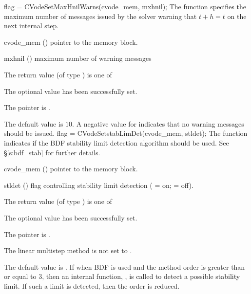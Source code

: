 {
flag = CVodeSetMaxHnilWarns(cvode\_mem, mxhnil);
}
{
  The function  specifies the maximum number of
  messages issued by the solver warning that $t+h=t$ on the next internal step.
}
{
  \begin{args}
  \item[cvode\_mem] ()
    pointer to the {\cvodes} memory block.
  \item[mxhnil] ()
    maximum number of warning messages
  \end{args}
}
{
  The return value  (of type ) is one of
  \begin{args}
  \item[\Id{CV\_SUCCESS}] 
    The optional value has been successfully set.
  \item[\Id{CV\_MEM\_NULL}]
    The  pointer is .
  \end{args}
}
{
  The default value is $10$.
  A negative value for  indicates that no warning messages should
  be issued.
}
{
flag = CVodeSetstabLimDet(cvode\_mem, stldet);
}
{
  The function  indicates if
  the BDF stability limit detection algorithm should be used. See \S\ref{s:bdf_stab}
  for further details.
}
{
  \begin{args}
  \item[cvode\_mem] ()
    pointer to the {\cvodes} memory block.
  \item[stldet] ()
    flag controlling stability limit detection ( = on;  = off).
  \end{args}
}
{
  The return value  (of type ) is one of
  \begin{args}
  \item[\Id{CV\_SUCCESS}] 
    The optional value has been successfully set.
  \item[\Id{CV\_MEM\_NULL}]
    The  pointer is .
  \item[\Id{CV\_ILL\_INPUT}]
    The linear multistep method is not set to .
  \end{args}
}
{
  The default value is . If  when BDF is used
  and the method order is greater than or equal to 3, then an internal function, ,
  is called to detect a possible stability limit. If such a limit is detected, then the order is
  reduced.
}
